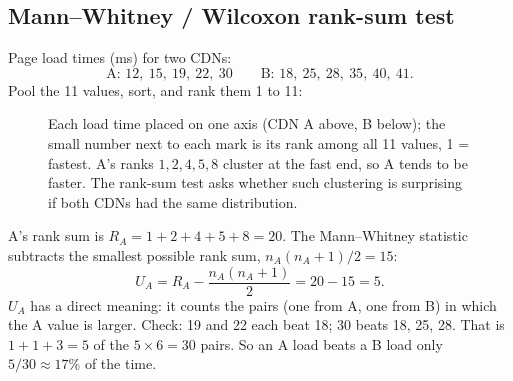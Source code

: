 \subsection{Mann--Whitney / Wilcoxon rank-sum test}

Page load times (ms) for two CDNs:
\[
  \text{A: } 12,\ 15,\ 19,\ 22,\ 30 \qquad
  \text{B: } 18,\ 25,\ 28,\ 35,\ 40,\ 41.
\]
Pool the 11 values, sort, and rank them 1 to 11:

\begin{figure}[H]
\centering
{}
\caption{Each load time placed on one axis (CDN A above, B below); the small
number next to each mark is its rank among all 11 values, 1 = fastest. A's
ranks $1,2,4,5,8$ cluster at the fast end, so A tends to be faster. The
rank-sum test asks whether such clustering is surprising if both CDNs had the
same distribution.}
\label{fig:cg-ranks}
\end{figure}

A's rank sum is $R_A = 1 + 2 + 4 + 5 + 8 = 20$. The Mann--Whitney statistic
subtracts the smallest possible rank sum, $n_A(n_A+1)/2 = 15$:
\[
  U_A = R_A - \frac{n_A(n_A+1)}{2} = 20 - 15 = 5.
\]
$U_A$ has a direct meaning: it counts the pairs (one from A, one from B) in
which the A value is larger. Check: 19 and 22 each beat 18; 30 beats 18, 25,
28. That is $1+1+3 = 5$ of the $5 \times 6 = 30$ pairs. So an A load beats a
B load only $5/30 \approx 17\%$ of the time.

